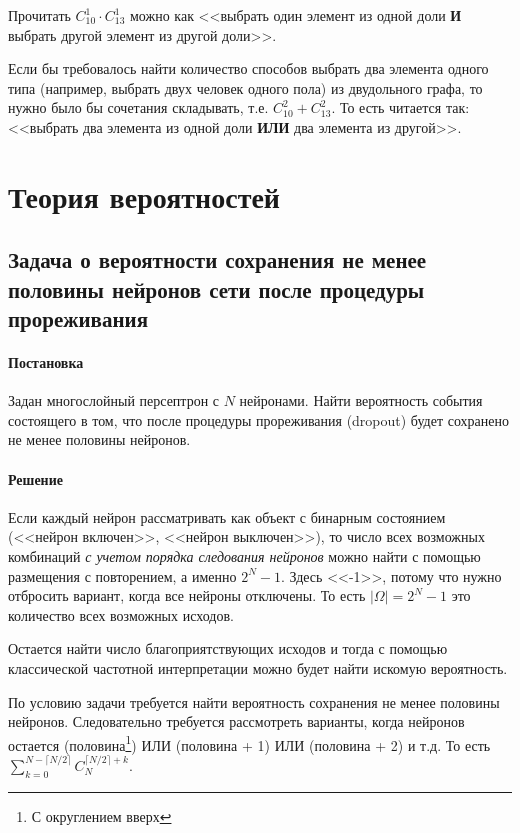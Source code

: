 \documentclass[%
	11pt,
	a4paper,
	utf8,
		]{article}
\begin{document}
Прочитать $ C_{10}^1 \cdot C_{13}^1 $ можно как <<выбрать один элемент из одной доли \textbf{И} выбрать другой элемент из другой доли>>.

Если бы требовалось найти количество способов выбрать два элемента одного типа (например, выбрать двух человек одного пола) из двудольного графа, то нужно было бы сочетания складывать, т.е. $ C_{10}^2 + C_{13}^2 $. То есть читается так: <<выбрать два элемента из одной доли \textbf{ИЛИ} два элемента из другой>>.

\section{Теория вероятностей}

\subsection{Задача о вероятности сохранения не менее половины нейронов сети после процедуры прореживания}

\paragraph{Постановка} Задан многослойный персептрон с $ N $ нейронами. Найти вероятность события состоящего в том, что после процедуры прореживания (dropout) будет сохранено не менее половины нейронов.

\paragraph{Решение} Если каждый нейрон рассматривать как объект с бинарным состоянием (<<нейрон включен>>, <<нейрон выключен>>), то число всех возможных комбинаций \emph{с учетом порядка следования нейронов} можно найти с помощью размещения с повторением, а именно $ 2^N - 1 $. Здесь <<-1>>, потому что нужно отбросить вариант, когда все нейроны отключены. То есть $ | \Omega | =  2^N - 1 $ это количество всех возможных исходов.

Остается найти число благоприятствующих исходов и тогда с помощью классической частотной интерпретации можно будет найти искомую вероятность.

По условию задачи требуется найти вероятность сохранения не менее половины нейронов. Следовательно требуется рассмотреть варианты, когда нейронов остается (половина\footnote{С округлением вверх}) ИЛИ (половина + 1) ИЛИ (половина + 2) и т.д. То есть $ \sum\limits_{k=0}^{N - \lceil N / 2 \rceil} C_{N}^{ \lceil N/2 \rceil + k } $.
\end{document}
